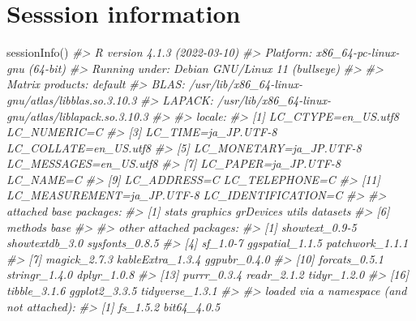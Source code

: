 \documentclass[
]{book}
\newenvironment{Shaded}{\begin{snugshade}}{\end{snugshade}}
\newcommand{\CommentTok}[1]{\textcolor[rgb]{0.56,0.35,0.01}{\textit{#1}}}
\newcommand{\FunctionTok}[1]{\textcolor[rgb]{0.00,0.00,0.00}{#1}}
\newcommand{\NormalTok}[1]{#1}
\theoremstyle{definition}
\theoremstyle{definition}
\theoremstyle{definition}
\theoremstyle{definition}
\theoremstyle{remark}
\begin{document}
\hypertarget{sesssion-information}{%
\section{Sesssion information}\label{sesssion-information}}

\begin{Shaded}
\begin{Highlighting}[]
\FunctionTok{sessionInfo}\NormalTok{()}
\CommentTok{\#\textgreater{} R version 4.1.3 (2022{-}03{-}10)}
\CommentTok{\#\textgreater{} Platform: x86\_64{-}pc{-}linux{-}gnu (64{-}bit)}
\CommentTok{\#\textgreater{} Running under: Debian GNU/Linux 11 (bullseye)}
\CommentTok{\#\textgreater{} }
\CommentTok{\#\textgreater{} Matrix products: default}
\CommentTok{\#\textgreater{} BLAS:   /usr/lib/x86\_64{-}linux{-}gnu/atlas/libblas.so.3.10.3}
\CommentTok{\#\textgreater{} LAPACK: /usr/lib/x86\_64{-}linux{-}gnu/atlas/liblapack.so.3.10.3}
\CommentTok{\#\textgreater{} }
\CommentTok{\#\textgreater{} locale:}
\CommentTok{\#\textgreater{}  [1] LC\_CTYPE=en\_US.utf8        LC\_NUMERIC=C              }
\CommentTok{\#\textgreater{}  [3] LC\_TIME=ja\_JP.UTF{-}8        LC\_COLLATE=en\_US.utf8     }
\CommentTok{\#\textgreater{}  [5] LC\_MONETARY=ja\_JP.UTF{-}8    LC\_MESSAGES=en\_US.utf8    }
\CommentTok{\#\textgreater{}  [7] LC\_PAPER=ja\_JP.UTF{-}8       LC\_NAME=C                 }
\CommentTok{\#\textgreater{}  [9] LC\_ADDRESS=C               LC\_TELEPHONE=C            }
\CommentTok{\#\textgreater{} [11] LC\_MEASUREMENT=ja\_JP.UTF{-}8 LC\_IDENTIFICATION=C       }
\CommentTok{\#\textgreater{} }
\CommentTok{\#\textgreater{} attached base packages:}
\CommentTok{\#\textgreater{} [1] stats     graphics  grDevices utils     datasets }
\CommentTok{\#\textgreater{} [6] methods   base     }
\CommentTok{\#\textgreater{} }
\CommentTok{\#\textgreater{} other attached packages:}
\CommentTok{\#\textgreater{}  [1] showtext\_0.9{-}5   showtextdb\_3.0   sysfonts\_0.8.5  }
\CommentTok{\#\textgreater{}  [4] sf\_1.0{-}7         ggspatial\_1.1.5  patchwork\_1.1.1 }
\CommentTok{\#\textgreater{}  [7] magick\_2.7.3     kableExtra\_1.3.4 ggpubr\_0.4.0    }
\CommentTok{\#\textgreater{} [10] forcats\_0.5.1    stringr\_1.4.0    dplyr\_1.0.8     }
\CommentTok{\#\textgreater{} [13] purrr\_0.3.4      readr\_2.1.2      tidyr\_1.2.0     }
\CommentTok{\#\textgreater{} [16] tibble\_3.1.6     ggplot2\_3.3.5    tidyverse\_1.3.1 }
\CommentTok{\#\textgreater{} }
\CommentTok{\#\textgreater{} loaded via a namespace (and not attached):}
\CommentTok{\#\textgreater{}  [1] fs\_1.5.2           bit64\_4.0.5       }

\end{Highlighting}
\end{Shaded}
\end{document}
